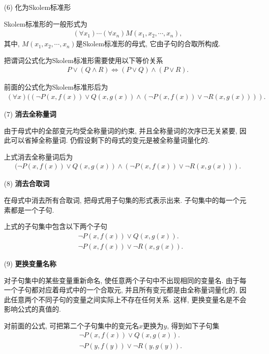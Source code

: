 (6) 化为Skolem标准形

Skolem标准形的一般形式为
\begin{align}
    (\forall x_1)\cdots(\forall x_n) M(x_1,x_2,\cdots,x_n),
\end{align}
其中, $M(x_1,x_2,\cdots,x_n)$是Skolem标准形的母式, 它由子句的合取所构成.
\begin{remark}
把谓词公式化为Skolem标准形需要使用以下等价关系
\begin{align}
    P\vee (Q\wedge R) \Leftrightarrow  (P\vee Q)\wedge (P\vee R).
\end{align}
\end{remark}

\begin{example}
前面的公式化为Skolem标准形后为
\begin{align}
    (\forall x)((\neg P(x,f(x))\vee Q(x,g(x))\wedge (\neg P(x,f(x))\vee \neg R(x,g(x)))).
\end{align}
\end{example}

(7)\textbf{ 消去全称量词}

由于母式中的全部变元均受全称量词的约束, 并且全称量词的次序已无关紧要, 因此可以省掉全称量词. 仍假设剩下的母式的变元是被全称量词量化的.
\begin{example}
上式消去全称量词后为
\begin{align}
  (\neg P(x,f(x))\vee Q(x,g(x)) \wedge (\neg P(x,f(x))\vee \neg R(x,g(x))).
\end{align}
\end{example}

(8) \textbf{消去合取词}

在母式中消去所有合取词, 把母式用子句集的形式表示出来. 子句集中的每一个元素都是一个子句.
\begin{example}
上式的子句集中包含以下两个子句
\begin{align}
  &\neg P(x,f(x))\vee Q(x,g(x)).\\
  &\neg P(x,f(x))\vee \neg R(x,g(x)).
\end{align}
\end{example}

(9) \textbf{更换变量名称}

对子句集中的某些变量重新命名, 使任意两个子句中不出现相同的变量名. 由于每一个子句都对应着母式中的一个合取元, 并且所有变元都是由全称量词量化的, 因此任意两个不同子句的变量之间实际上不存在任何关系. 这样, 更换变量名是不会影响公式的真值的.
\begin{example}
对前面的公式, 可把第二个子句集中的变元名$x$更换为$y$, 得到如下子句集
\begin{align}
  &\neg P(x,f(x))\vee Q(x,g(x)).\\
  &\neg P(y,f(y))\vee \neg R(y,g(y)).
\end{align}
\end{example}
